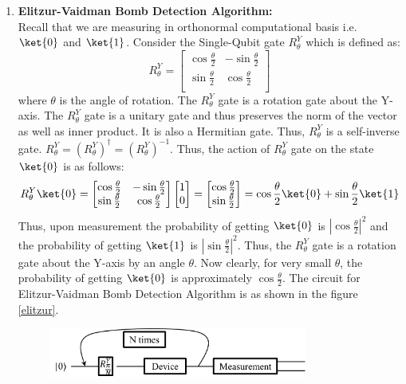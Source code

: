 \documentclass[12pt, oneside]{book}
\theoremstyle{definition}
\theoremstyle{definition}
\theoremstyle{remark}
\begin{document}
\begin{enumerate}
    \item \textbf{Elitzur-Vaidman Bomb Detection Algorithm: }\\
    Recall that we are measuring in orthonormal computational basis i.e. $\ket{0}$ and $\ket{1}$. Consider the Single-Qubit gate $R^Y_{\theta}$ which is defined as:
    \[
        R^Y_{\theta}=\begin{bmatrix}
            \cos\frac{\theta}{2} & -\sin\frac{\theta}{2} \\
            \sin\frac{\theta}{2} & \cos\frac{\theta}{2} \\
        \end{bmatrix}
    \]
    where $\theta$ is the angle of rotation. The $R^Y_{\theta}$ gate is a rotation gate about the Y-axis. The $R^Y_{\theta}$ gate is a unitary gate and thus preserves the norm of the vector as well as inner product. It is also a Hermitian gate. Thus, $R^Y_{\theta}$ is a self-inverse gate. $R^Y_{\theta}=(R^Y_{\theta})^{\dagger}=(R^Y_{\theta})^{-1}$.
    Thus, the action of $R^Y_{\theta}$ gate on the state $\ket{0}$ is as follows:
    \[
        R^Y_{\theta}\ket{0}=\begin{bmatrix}
            \cos\frac{\theta}{2} & -\sin\frac{\theta}{2} \\
            \sin\frac{\theta}{2} & \cos\frac{\theta}{2} \\
        \end{bmatrix}\begin{bmatrix}
            1 \\
            0 \\
        \end{bmatrix}=\begin{bmatrix}
            \cos\frac{\theta}{2} \\
            \sin\frac{\theta}{2} \\
        \end{bmatrix}=\cos\frac{\theta}{2}\ket{0}+\sin\frac{\theta}{2}\ket{1}
    \]
    Thus, upon measurement the probability of getting $\ket{0}$ is $|\cos\frac{\theta}{2}|^2$ and the probability of getting $\ket{1}$ is $|\sin\frac{\theta}{2}|^2$. Thus, the $R^Y_{\theta}$ gate is a rotation gate about the Y-axis by an angle $\theta$.
    Now clearly, for very small $\theta$, the probability of getting $\ket{0}$ is approximately $\cos \frac{\theta}{2}$.
    The circuit for Elitzur-Vaidman Bomb Detection Algorithm is as shown in the figure \ref{elitzur}.
    \begin{figure}[H]
        \centering
        \includegraphics[width=0.8\textwidth]{../images/elitzur-vaidmanfinal.png}

\end{figure}
\end{enumerate}
\end{document}
